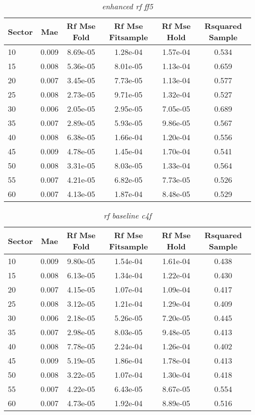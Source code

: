 \begin{table}[H]
\caption{\textit{enhanced rf ff5}}\label{tab:enhanced_rf_ff5}
\centering
\begin{tabular}{lccccc}
\hline\hline
Sector & Mae & Rf Mse Fold & Rf Mse Fitsample & Rf Mse Hold & Rsquared Sample \\ 
\hline
10 & 0.009 & 8.69e-05 & 1.28e-04 & 1.57e-04 & 0.534 \\ 
15 & 0.008 & 5.36e-05 & 8.01e-05 & 1.13e-04 & 0.659 \\ 
20 & 0.007 & 3.45e-05 & 7.73e-05 & 1.13e-04 & 0.577 \\ 
25 & 0.008 & 2.73e-05 & 9.71e-05 & 1.32e-04 & 0.527 \\ 
30 & 0.006 & 2.05e-05 & 2.95e-05 & 7.05e-05 & 0.689 \\ 
35 & 0.007 & 2.89e-05 & 5.93e-05 & 9.86e-05 & 0.567 \\ 
40 & 0.008 & 6.38e-05 & 1.66e-04 & 1.20e-04 & 0.556 \\ 
45 & 0.009 & 4.78e-05 & 1.45e-04 & 1.70e-04 & 0.541 \\ 
50 & 0.008 & 3.31e-05 & 8.03e-05 & 1.33e-04 & 0.564 \\ 
55 & 0.007 & 4.21e-05 & 6.82e-05 & 7.73e-05 & 0.526 \\ 
60 & 0.007 & 4.13e-05 & 1.87e-04 & 8.48e-05 & 0.529 \\ 
\hline
\end{tabular}
\end{table}


\begin{table}[H]
\caption{\textit{rf baseline c4f}}\label{tab:rf_baseline_c4f}
\centering
\begin{tabular}{lccccc}
\hline\hline
Sector & Mae & Rf Mse Fold & Rf Mse Fitsample & Rf Mse Hold & Rsquared Sample \\ 
\hline
10 & 0.009 & 9.80e-05 & 1.54e-04 & 1.61e-04 & 0.438 \\ 
15 & 0.008 & 6.13e-05 & 1.34e-04 & 1.22e-04 & 0.430 \\ 
20 & 0.007 & 4.15e-05 & 1.07e-04 & 1.09e-04 & 0.417 \\ 
25 & 0.008 & 3.12e-05 & 1.21e-04 & 1.29e-04 & 0.409 \\ 
30 & 0.006 & 2.18e-05 & 5.26e-05 & 7.20e-05 & 0.445 \\ 
35 & 0.007 & 2.98e-05 & 8.03e-05 & 9.48e-05 & 0.413 \\ 
40 & 0.008 & 7.78e-05 & 2.24e-04 & 1.26e-04 & 0.402 \\ 
45 & 0.009 & 5.19e-05 & 1.86e-04 & 1.78e-04 & 0.413 \\ 
50 & 0.008 & 3.22e-05 & 1.07e-04 & 1.30e-04 & 0.418 \\ 
55 & 0.007 & 4.22e-05 & 6.43e-05 & 8.67e-05 & 0.554 \\ 
60 & 0.007 & 4.73e-05 & 1.92e-04 & 8.89e-05 & 0.516 \\ 
\hline
\end{tabular}
\end{table}


